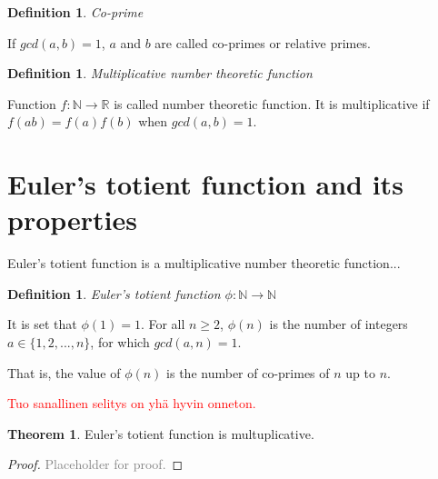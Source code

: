 \documentclass{article}
\theoremstyle{definition}
\newtheorem{definition}[subsubsection]{Definition}
\newtheorem{theorem}[subsubsection]{Theorem}
\begin{document}
\begin{definition}{\emph{Co-prime}}

If $gcd(a,b) = 1$, $a$ and $b$ are called co-primes or relative primes.

\end{definition}

\begin{definition}{\emph{Multiplicative number theoretic function}}

Function $f: \mathbb{N} \rightarrow \mathbb{R}$ is called number theoretic function. It is multiplicative if $f(ab) = f(a)f(b)$ when $gcd(a, b)=1$.

\end{definition}

\section{Euler's totient function and its properties}

Euler's totient function is a multiplicative number theoretic function...

\begin{definition}{\emph{Euler's totient function $\phi: \mathbb{N} \rightarrow \mathbb{N}$}}

It is set that $\phi(1) = 1$. For all $n \geq 2$, $\phi(n)$ is the number of integers $a \in \{1,2,...,n\}$, for which $gcd(a,n) = 1$.


\end{definition}


That is, the value of $\phi(n)$ is the number of co-primes of $n$ up to $n$.

\textcolor{red}{Tuo sanallinen selitys on yhä hyvin onneton.}

\begin{theorem}
Euler's totient function is multuplicative.
\begin{proof}
\textcolor{gray}{Placeholder for proof.}
\end{proof}
\end{theorem}
\end{document}
